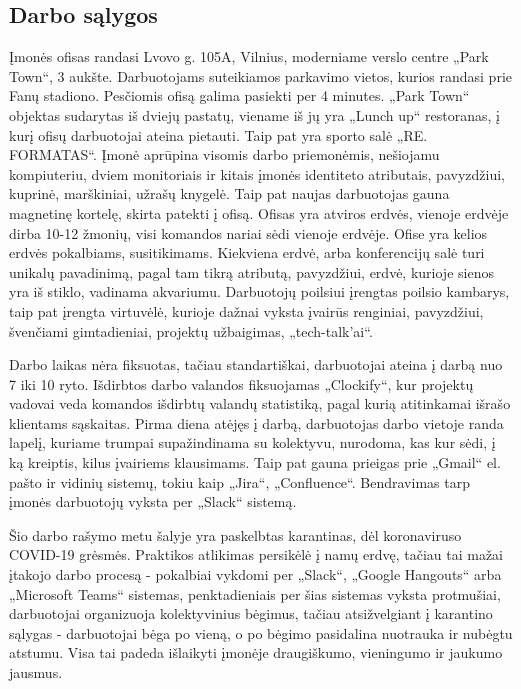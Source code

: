 \subsection{Darbo sąlygos}
Įmonės ofisas randasi Lvovo g. 105A, Vilnius, moderniame verslo centre „Park Town“, 3 aukšte. Darbuotojams suteikiamos parkavimo vietos, kurios randasi prie Fanų stadiono.
Pesčiomis ofisą galima pasiekti per 4 minutes. „Park Town“ objektas sudarytas iš dviejų pastatų, viename iš jų yra „Lunch up“ restoranas, į kurį ofisų darbuotojai ateina pietauti.
Taip pat yra sporto salė „RE. FORMATAS“. Įmonė aprūpina visomis darbo priemonėmis, nešiojamu kompiuteriu, dviem monitoriais ir kitais įmonės identiteto atributais, pavyzdžiui,
kuprinė, marškiniai, užrašų knygelė. Taip pat naujas darbuotojas gauna magnetinę kortelę, skirta patekti į ofisą.
Ofisas yra atviros erdvės, vienoje erdvėje dirba 10-12 žmonių, visi komandos nariai sėdi vienoje erdvėje.
Ofise yra kelios erdvės pokalbiams, susitikimams. Kiekviena erdvė, arba konferencijų salė turi unikalų pavadinimą, pagal tam tikrą atributą, pavyzdžiui,
erdvė, kurioje sienos yra iš stiklo, vadinama akvariumu. Darbuotojų poilsiui įrengtas poilsio kambarys, taip pat įrengta virtuvėlė,
kurioje dažnai vyksta įvairūs renginiai, pavyzdžiui, švenčiami gimtadieniai, projektų užbaigimas, „tech-talk'ai“.

Darbo laikas nėra fiksuotas, tačiau standartiškai, darbuotojai ateina į darbą nuo 7 iki 10 ryto. Išdirbtos darbo valandos fiksuojamas „Clockify“, kur projektų vadovai veda
komandos išdirbtų valandų statistiką, pagal kurią atitinkamai išrašo klientams sąskaitas.
Pirma diena atėjęs į darbą, darbuotojas darbo vietoje randa lapelį, kuriame trumpai supažindinama su kolektyvu, nurodoma, kas kur sėdi, į ką kreiptis, kilus įvairiems klausimams.
Taip pat gauna prieigas prie „Gmail“ el. pašto ir vidinių sistemų, tokiu kaip „Jira“, „Confluence“. Bendravimas tarp įmonės darbuotojų vyksta per „Slack“ sistemą.

Šio darbo rašymo metu šalyje yra paskelbtas karantinas, dėl koronaviruso COVID-19 grėsmės. Praktikos atlikimas persikėlė į namų erdvę, tačiau tai mažai įtakojo
darbo procesą - pokalbiai vykdomi per „Slack“, „Google Hangouts“ arba „Microsoft Teams“ sistemas, penktadieniais per šias sistemas vyksta protmušiai, darbuotojai organizuoja
kolektyvinius bėgimus, tačiau atsižvelgiant į karantino sąlygas - darbuotojai bėga po vieną, o po bėgimo pasidalina nuotrauka ir nubėgtu atstumu. Visa tai padeda išlaikyti
įmonėje draugiškumo, vieningumo ir jaukumo jausmus.
